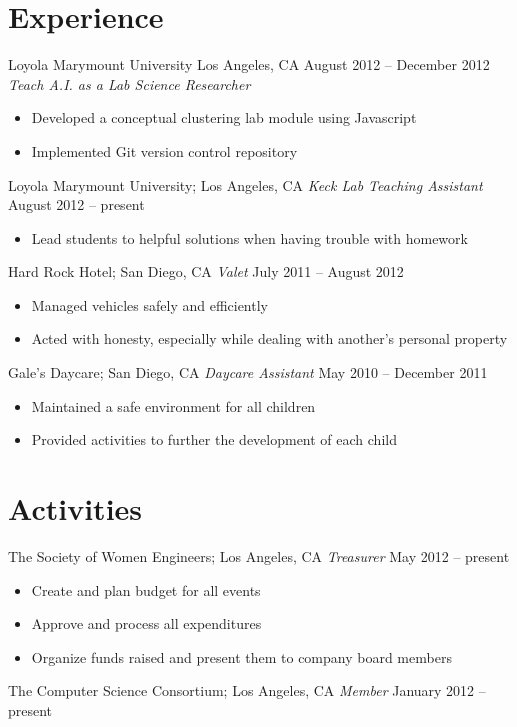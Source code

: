 \documentclass[line, margin]{res}
\begin{document}
\begin{resume}
\section{Experience}
Loyola Marymount University Los Angeles, CA \hfill August 2012 – December 2012
\textit{Teach A.I. as a Lab Science Researcher}
\begin{itemize}
\item Developed a conceptual clustering lab module using Javascript
\item Implemented Git version control repository
\end{itemize}
Loyola Marymount University; Los Angeles, CA
\textit{Keck Lab Teaching Assistant} \hfill August 2012 – present
\begin{itemize}
\item Lead students to helpful solutions when having trouble with homework
\end{itemize}
Hard Rock Hotel; San Diego, CA
\textit{Valet} \hfill July 2011 – August 2012
\begin{itemize}
\item Managed vehicles safely and efficiently
\item Acted with honesty, especially while dealing with another’s personal property
\end{itemize}
Gale’s Daycare; San Diego, CA
\textit{Daycare Assistant} \hfill May 2010 – December 2011
\begin{itemize}
\item Maintained a safe environment for all children
\item Provided activities to further the development of each child
\end{itemize}

\section{Activities}
The Society of Women Engineers; Los Angeles, CA
\textit{Treasurer} \hfill May 2012 – present
\begin{itemize}
\item Create and plan budget for all events
\item Approve and process all expenditures
\item Organize funds raised and present them to company board members
\end{itemize}
The Computer Science Consortium; Los Angeles, CA
\textit{Member} \hfill January 2012 – present
	
\end{resume}
\end{document}
